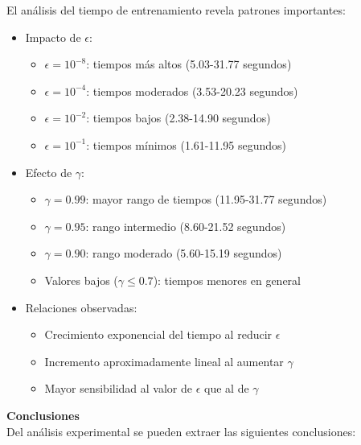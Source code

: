El análisis del tiempo de entrenamiento revela patrones importantes:

\begin{itemize}
    \item Impacto de $\epsilon$:
    \begin{itemize}
        \item $\epsilon = 10^{-8}$: tiempos más altos (5.03-31.77 segundos)
        \item $\epsilon = 10^{-4}$: tiempos moderados (3.53-20.23 segundos)
        \item $\epsilon = 10^{-2}$: tiempos bajos (2.38-14.90 segundos)
        \item $\epsilon = 10^{-1}$: tiempos mínimos (1.61-11.95 segundos)
    \end{itemize}
    \item Efecto de $\gamma$:
    \begin{itemize}
        \item $\gamma = 0.99$: mayor rango de tiempos (11.95-31.77 segundos)
        \item $\gamma = 0.95$: rango intermedio (8.60-21.52 segundos)
        \item $\gamma = 0.90$: rango moderado (5.60-15.19 segundos)
        \item Valores bajos ($\gamma \leq 0.7$): tiempos menores en general
    \end{itemize}
    \item Relaciones observadas:
    \begin{itemize}
        \item Crecimiento exponencial del tiempo al reducir $\epsilon$
        \item Incremento aproximadamente lineal al aumentar $\gamma$
        \item Mayor sensibilidad al valor de $\epsilon$ que al de $\gamma$
    \end{itemize}
\end{itemize}
\newpage
\textbf{Conclusiones}
\\

Del análisis experimental se pueden extraer las siguientes conclusiones:

